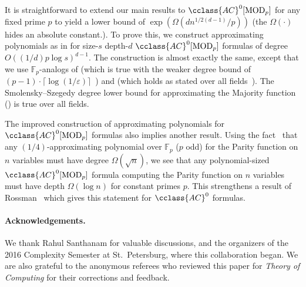 \documentclass{toc}
\newcommand{\F}{\mathbb{F}}
\newcommand{\AC}{\cclass{AC}}
\begin{document}
%
%
It is straightforward to extend our main results  %
to $\AC^0[\mathrm{MOD}_p]$ for any fixed prime $p$ to yield a lower bound
of $\exp(\Omega(dn^{1/2(d-1)}/p))$ (the $\Omega(\cdot)$ hides an absolute constant.). To prove this, we construct approximating polynomials as in  for size-$s$ depth-$d$ $\AC^0[\mathrm{MOD}_p]$ formulas of degree $O(({1}/{d})p\log s)^{d-1}$. The construction is almost exactly the same,
except that we use $\F_p$-analogs of  (which is
true with the weaker degree bound of
$(p-1)\cdot \lceil \log(1/\varepsilon)\rceil$~\cite{Smolensky87})
and  (which holds as stated over all fields~\cite{HS}).
%
The Smolensky--Szegedy  %
degree lower bound for approximating the Majority function
() is true over all fields.

The improved construction of approximating polynomials for $\AC^0[\mathrm{MOD}_p]$ formulas also implies another result. Using the fact~\cite{Smolensky87} that any $(1/4)$-approximating polynomial over $\F_p$ ($p$ odd) for the Parity function on $n$ variables must have degree $\Omega(\sqrt{n})$, we see that any polynomial-sized $\AC^0[\mathrm{MOD}_p]$ formula computing the Parity function on $n$ variables must have depth $\Omega(\log n)$ for constant primes $p$. This strengthens a result of Rossman~\cite{Rossman2015average} which gives this statement for $\AC^0$ formulas.


\paragraph{Acknowledgements.}

We thank Rahul Santhanam for valuable discussions, and the organizers of the 2016 Complexity Semester at St.\ Petersburg, where this collaboration began. We are also grateful to the anonymous referees who reviewed this paper for \emph{Theory of Computing} for their corrections and feedback.


%

\nocite{savicky2000number}



%
%
%
%

\end{document}
